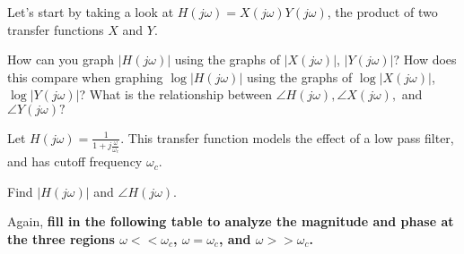 \begin{enumerate}

\qitem Let's start by taking a look at $H(j \omega) = X(j \omega)Y(j \omega)$, the product of two transfer functions $X$ and $Y$.
\begin{enumerate}
    \qitem How can you graph $|H(j \omega)|$ using the graphs of $|X(j \omega)|$, $|Y(j \omega)|$?
    \qitem How does this compare when graphing $\log |H(j \omega)|$ using the graphs of $\log |X(j \omega)|$, $\log |Y(j \omega)|$?
    \qitem What is the relationship between $\angle H(j \omega), \angle X(j \omega),$ and $\angle Y(j \omega)?$
\end{enumerate}
\ws{\vspace{60px}}

\qitem Let $H(j \omega) = \frac{1}{1 + j \frac{\omega}{\omega_c}}$. This transfer function models the effect of a low pass filter, and has cutoff frequency $\omega_{c}.$

\begin{enumerate}
    \qitem Find $|H(j \omega)|$ and $\angle H(j \omega)$.


    \qitem Again, \textbf{fill in the following table to analyze the magnitude and phase at the three regions $\omega << \omega_{c}$, $\omega = \omega_{c}$, and $\omega >> \omega_{c}$.}


\end{enumerate}
\end{enumerate}
